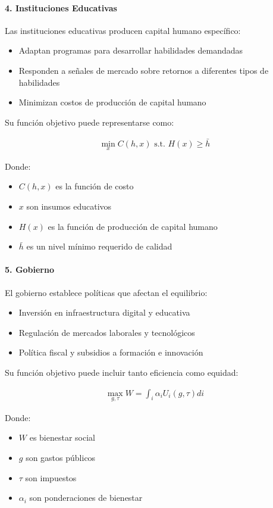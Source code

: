 \documentclass{article}
\theoremstyle{remark}
\theoremstyle{definition}
\begin{document}
\begin{tcolorbox}
\paragraph{4. Instituciones Educativas}
Las instituciones educativas producen capital humano específico:

\begin{itemize}
\item Adaptan programas para desarrollar habilidades demandadas
\item Responden a señales de mercado sobre retornos a diferentes tipos de habilidades
\item Minimizan costos de producción de capital humano
\end{itemize}

Su función objetivo puede representarse como:

\begin{align}
\min_{x} C(h, x) \text{ s.t. } H(x) \geq \bar{h}
\end{align}

Donde:
\begin{itemize}
\item $C(h, x)$ es la función de costo
\item $x$ son insumos educativos
\item $H(x)$ es la función de producción de capital humano
\item $\bar{h}$ es un nivel mínimo requerido de calidad
\end{itemize}

\paragraph{5. Gobierno}
El gobierno establece políticas que afectan el equilibrio:

\begin{itemize}
\item Inversión en infraestructura digital y educativa
\item Regulación de mercados laborales y tecnológicos
\item Política fiscal y subsidios a formación e innovación
\end{itemize}

Su función objetivo puede incluir tanto eficiencia como equidad:

\begin{align}
\max_{g,\tau} W = \int_i \alpha_i U_i(g, \tau) di
\end{align}

Donde:
\begin{itemize}
\item $W$ es bienestar social
\item $g$ son gastos públicos
\item $\tau$ son impuestos
\item $\alpha_i$ son ponderaciones de bienestar
\end{itemize}


\end{tcolorbox}
\end{document}
